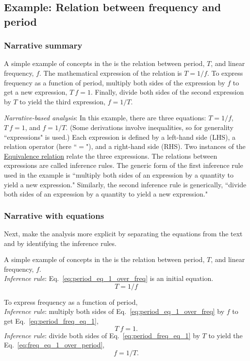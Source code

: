 \subsection{Example: Relation between frequency and period\label{sec:period_freq_example}}

\subsubsection{Narrative summary}
A simple example of concepts in the \pdg{} is the relation between period, $T$, and linear frequency, $f$.
The mathematical expression of the relation is $T=1/f$.
To express frequency as a function of period, multiply both sides of the expression by $f$ to get a new expression, $T\ f=1$.
  Finally, divide both sides of the second expression by $T$ to yield the third expression, $f=1/T$.

\textit{Narrative-based analysis}: In this example, there are three equations: \(T=1/f\), \(T\ f=1\), and \(f=1/T\). (Some derivations involve inequalities, so for generality ``expressions" is used.)
Each \gls{expression} is defined by a left-hand side (LHS), a \gls{relation operator} (here ``$=$"), and a right-hand side (RHS).
Two instances of the \href{https://en.wikipedia.org/wiki/Equivalence_relation#Definition}{Equivalence relation} relate the three expressions.
The relations between expressions are called \glspl{inference rule}.
The generic form of the first inference rule used in the example is ``multiply both sides of an expression by a quantity to yield a new expression."
Similarly, the second inference rule is generically, ``divide both sides of an expression by a quantity to yield a new expression."

\subsubsection{Narrative with equations}
Next, make the analysis more explicit by separating the equations from the text and by identifying the inference rules. 

A simple example of concepts in the \pdg{} is the relation between period, $T$, and linear frequency, $f$.\\
\textit{Inference rule}: Eq.~\ref{eq:period_eq_1_over_freq} is an initial equation.
\begin{equation}
T=1/f    
\label{eq:period_eq_1_over_freq}
\end{equation}

To express frequency as a function of period, \\
\textit{Inference rule}: multiply both sides of Eq.~\ref{eq:period_eq_1_over_freq} by $f$ to get Eq.~\ref{eq:period_freq_eq_1},
\begin{equation}
T\ f=1.
\label{eq:period_freq_eq_1}
\end{equation}
\textit{Inference rule}:  divide both sides of Eq.~\ref{eq:period_freq_eq_1} by $T$ to yield the Eq.~\ref{eq:freq_eq_1_over_period}, 
\begin{equation}
  f=1/T.  
  \label{eq:freq_eq_1_over_period}
\end{equation}


